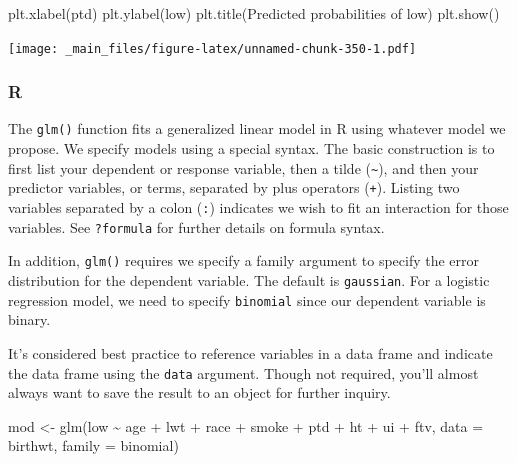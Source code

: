 \documentclass[
]{book}
\newenvironment{Shaded}{\begin{snugshade}}{\end{snugshade}}
\newcommand{\AttributeTok}[1]{\textcolor[rgb]{0.77,0.63,0.00}{#1}}
\newcommand{\FunctionTok}[1]{\textcolor[rgb]{0.00,0.00,0.00}{#1}}
\newcommand{\NormalTok}[1]{#1}
\newcommand{\OtherTok}[1]{\textcolor[rgb]{0.56,0.35,0.01}{#1}}
\newcommand{\SpecialCharTok}[1]{\textcolor[rgb]{0.00,0.00,0.00}{#1}}
\newcommand{\StringTok}[1]{\textcolor[rgb]{0.31,0.60,0.02}{#1}}
\begin{document}
\begin{Shaded}
\begin{Highlighting}[]
\NormalTok{plt.xlabel(}\StringTok{\textquotesingle{}ptd\textquotesingle{}}\NormalTok{)}
\NormalTok{plt.ylabel(}\StringTok{\textquotesingle{}low\textquotesingle{}}\NormalTok{)}
\NormalTok{plt.title(}\StringTok{\textquotesingle{}Predicted probabilities of low\textquotesingle{}}\NormalTok{)}
\NormalTok{plt.show()}
\end{Highlighting}
\end{Shaded}

\texttt{[image: \_main\_files/figure-latex/unnamed-chunk-350-1.pdf]}

\hypertarget{r-50}{%
\subsubsection*{R}\label{r-50}}

The \texttt{glm()} function fits a generalized linear model in R using whatever model we propose. We specify models using a special syntax. The basic construction is to first list your dependent or response variable, then a tilde (\texttt{\textasciitilde{}}), and then your predictor variables, or terms, separated by plus operators (\texttt{+}). Listing two variables separated by a colon (\texttt{:}) indicates we wish to fit an interaction for those variables. See \texttt{?formula} for further details on formula syntax.

In addition, \texttt{glm()} requires we specify a family argument to specify the error distribution for the dependent variable. The default is \texttt{gaussian}. For a logistic regression model, we need to specify \texttt{binomial} since our dependent variable is binary.

It's considered best practice to reference variables in a data frame and indicate the data frame using the \texttt{data} argument. Though not required, you'll almost always want to save the result to an object for further inquiry.

\begin{Shaded}
\begin{Highlighting}[]
\NormalTok{mod }\OtherTok{\textless{}{-}} \FunctionTok{glm}\NormalTok{(low }\SpecialCharTok{\textasciitilde{}}\NormalTok{ age }\SpecialCharTok{+}\NormalTok{ lwt }\SpecialCharTok{+}\NormalTok{ race }\SpecialCharTok{+} 
\NormalTok{             smoke }\SpecialCharTok{+}\NormalTok{ ptd }\SpecialCharTok{+}\NormalTok{ ht }\SpecialCharTok{+} 
\NormalTok{             ui }\SpecialCharTok{+}\NormalTok{ ftv, }
           \AttributeTok{data =}\NormalTok{ birthwt, }\AttributeTok{family =}\NormalTok{ binomial)}
\end{Highlighting}
\end{Shaded}
\end{document}
